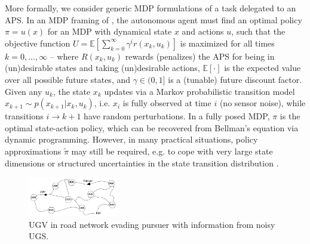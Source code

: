 More formally, we consider generic MDP formulations of a task \taks{} delegated to an APS. In an MDP framing of \task{}, the autonomous agent must find an optimal policy $\pi = u(x)$ for an MDP with dynamical state $x$ and actions $u$, such that the objective function
$U = \mathbb{E} \left[\sum_{k=0}^{\infty} \gamma^i r(x_k,u_k) \right]$ is maximized for all times $k=0,...,\infty$ --  
where $R(x_k,u_k)$ rewards (penalizes) the APS for being in (un)desirable states and taking (un)desirable actions, $\mathbb{E}[\cdot]$ is the expected value over all possible future states, and $\gamma \in (0,1]$ is a (tunable) future discount factor. 
Given any $u_k$, the state $x_k$ updates via a Markov probabilistic transition model $x_{k+1} \sim p(x_{k+1}|x_{k},u_{k})$,  
i.e. $x_{i}$ is fully observed at time $i$ (no sensor noise), while transitions $i\rightarrow k+1$ have random perturbations.
In a fully posed MDP, $\pi$ is the optimal state-action policy, which can be recovered from Bellman's equation via dynamic programming. 
However, in many practical situations, policy approximations $\tilde{\pi}$ may still be required, e.g. to cope with very large state dimensions or structured uncertainties in the state transition distribution \cite{Kochenderfer2015-uu}. 
    
	\begin{figure}[t]%
    	\centering
     	\includegraphics[width=0.35\textwidth]{Figures/RoadNet}
    	\caption{UGV in road network evading pursuer with information from noisy UGS.} 
        \label{fig:RoadNet}
        \vspace{-0.2cm}
    \end{figure}


